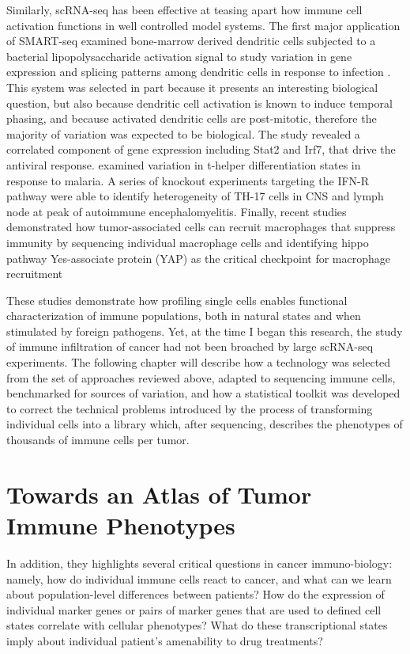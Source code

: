Similarly, scRNA-seq has been effective at teasing apart how immune cell activation functions in well controlled model systems. 
The first major application of SMART-seq examined bone-marrow derived dendritic cells subjected to a bacterial lipopolysaccharide activation signal to study variation in gene expression and splicing patterns among dendritic cells in response to infection \citep{Shalek2013}.
This system was selected in part because it presents an interesting biological question, but also because dendritic cell activation is known to induce temporal phasing, and because activated dendritic cells are post-mitotic, therefore the majority of variation was expected to be biological. 
The study revealed a correlated component of gene expression including Stat2 and Irf7, that drive the antiviral response.
\cite{Loennberg2017} examined variation in t-helper differentiation states in response to malaria. 
A series of knockout experiments targeting the IFN-R pathway \citep{Gaublomme2015} were able to identify heterogeneity of TH-17 cells in CNS and lymph node at peak of autoimmune encephalomyelitis. 
Finally, recent studies demonstrated how tumor-associated cells can recruit macrophages that suppress immunity by sequencing individual macrophage cells and identifying hippo pathway Yes-associate protein (YAP) as the critical checkpoint for macrophage recruitment \citep{Guo2017}

These studies demonstrate how profiling single cells enables functional characterization of immune populations, both in natural states and when stimulated by foreign pathogens. 
Yet, at the time I began this research, the study of immune infiltration of cancer had not been broached by large scRNA-seq experiments. 
The following chapter will describe how a technology was selected from the set of approaches reviewed above, adapted to sequencing immune cells, benchmarked for sources of variation, and how a statistical toolkit was developed to correct the technical problems introduced by the process of transforming individual cells into a library which, after sequencing, describes the phenotypes of thousands of immune cells per tumor. 

\section{Towards an Atlas of Tumor Immune Phenotypes}

In addition, they highlights several critical questions in cancer immuno-biology: namely, how do individual immune cells react to cancer, and what can we learn about population-level differences between patients? 
How do the expression of individual marker genes or pairs of marker genes that are used to defined cell states correlate with cellular phenotypes? 
What do these transcriptional states imply about individual patient's amenability to drug treatments?  


